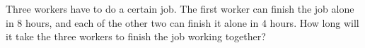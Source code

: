 Three workers have to do a certain job. The first worker can finish the job alone in $8$ hours, and each of the other two can finish it alone in $4$ hours. How long will it take the three workers to finish the job working together?
